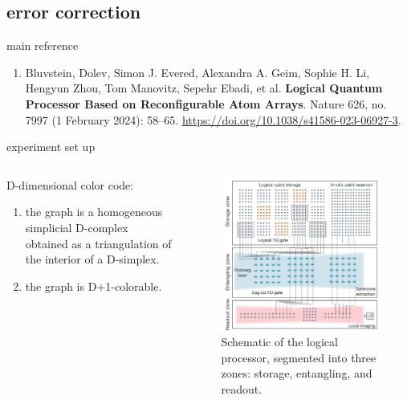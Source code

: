 \documentclass[18 pt]{beamer}
\begin{document}
\subsection{error correction}
\begin{frame}{main reference}
\begin{enumerate}
 \item Bluvstein, Dolev, Simon J. Evered, Alexandra A. Geim, Sophie H. Li, Hengyun Zhou, Tom Manovitz, Sepehr Ebadi, et al. \textbf{Logical Quantum Processor Based on Reconfigurable Atom Arrays}. Nature 626, no. 7997 (1 February 2024): 58–65. \url{https://doi.org/10.1038/s41586-023-06927-3}.
\end{enumerate}
\end{frame}
\begin{frame}{experiment set up}
  \begin{columns}
    \begin{column}{.5\textwidth}
      D-dimensional color code:
      \vspace{20pt}
      \begin{enumerate}
        \item the graph is a homogeneous simplicial D-complex obtained as a triangulation of the interior of a D-simplex.
        \item the graph is D+1-colorable.
      \end{enumerate}
    \end{column}
    \begin{column}{.5\textwidth}
      \begin{figure}
        \includegraphics[width=.8\textwidth]{IMG/qec.png}
        \caption{Schematic of the logical processor, segmented into three zones: storage, entangling, and readout.}
      \end{figure}
    \end{column}
  \end{columns}
\end{frame}
\end{document}
